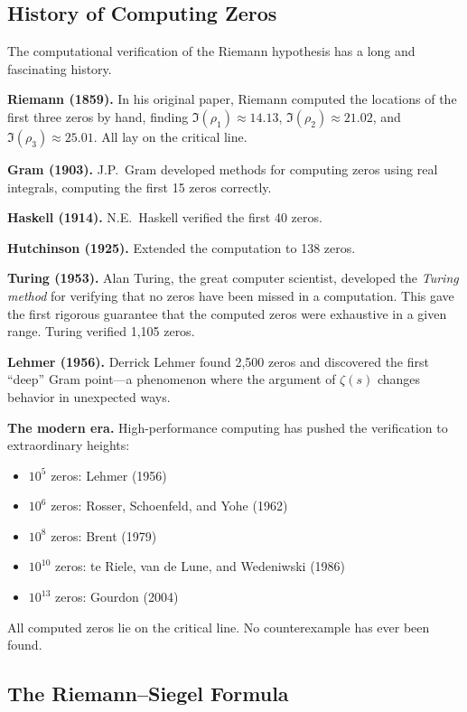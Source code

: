 \subsection{History of Computing Zeros}

The computational verification of the Riemann hypothesis has a long and fascinating history.

\textbf{Riemann (1859).} In his original paper, Riemann computed the locations of the first three zeros by hand, finding $\Im(\rho_1) \approx 14.13$, $\Im(\rho_2) \approx 21.02$, and $\Im(\rho_3) \approx 25.01$. All lay on the critical line.

\textbf{Gram (1903).} J.P.\ Gram developed methods for computing zeros using real integrals, computing the first 15 zeros correctly.

\textbf{Haskell (1914).} N.E.\ Haskell verified the first 40 zeros.

\textbf{Hutchinson (1925).} Extended the computation to 138 zeros.

\textbf{Turing (1953).} Alan Turing, the great computer scientist, developed the \textit{Turing method} for verifying that no zeros have been missed in a computation. This gave the first rigorous guarantee that the computed zeros were exhaustive in a given range. Turing verified 1,105 zeros.

\textbf{Lehmer (1956).} Derrick Lehmer found 2,500 zeros and discovered the first ``deep'' Gram point---a phenomenon where the argument of $\zeta(s)$ changes behavior in unexpected ways.

\textbf{The modern era.} High-performance computing has pushed the verification to extraordinary heights:
\begin{itemize}
  \item $10^5$ zeros: Lehmer (1956)
  \item $10^6$ zeros: Rosser, Schoenfeld, and Yohe (1962)
  \item $10^8$ zeros: Brent (1979)
  \item $10^{10}$ zeros: te Riele, van de Lune, and Wedeniwski (1986)
  \item $10^{13}$ zeros: Gourdon (2004)
\end{itemize}

All computed zeros lie on the critical line. No counterexample has ever been found.

\subsection{The Riemann--Siegel Formula}

